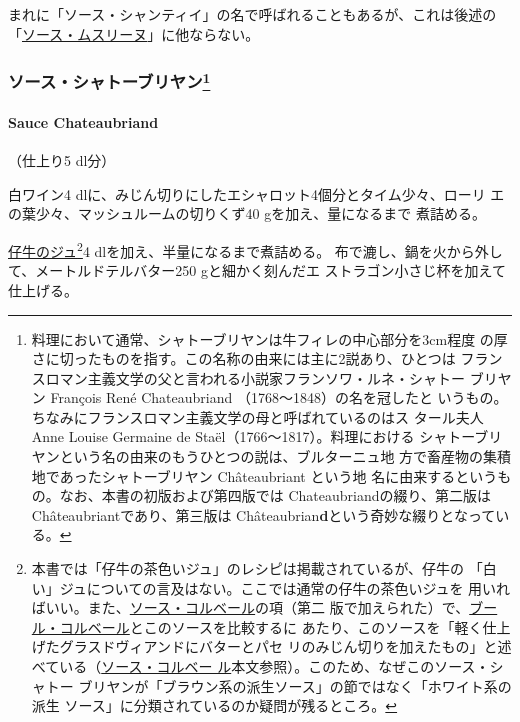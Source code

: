 \begin{recette}
まれに「ソース・シャンティイ」の名で呼ばれることもあるが、これは後述の
「\protect\hyperlink{sauce-mousseline}{ソース・ムスリーヌ}」に他ならない。

\maeaki

\hypertarget{ux30bdux30fcux30b9ux30b7ux30e3ux30c8ux30fcux30d6ux30eaux30e4ux30f323}{%
\subsubsection[ソース・シャトーブリヤン]{\texorpdfstring{ソース・シャトーブリヤン\footnote{料理において通常、シャトーブリヤンは牛フィレの中心部分を3cm程度
  の厚さに切ったものを指す。この名称の由来には主に2説あり、ひとつは
  フランスロマン主義文学の父と言われる小説家フランソワ・ルネ・シャトー
  ブリヤン François René Chateaubriand （1768〜1848）の名を冠したと
  いうもの。ちなみにフランスロマン主義文学の母と呼ばれているのはス
  タール夫人Anne Louise Germaine de Staël（1766〜1817）。料理における
  シャトーブリヤンという名の由来のもうひとつの説は、ブルターニュ地
  方で畜産物の集積地であったシャトーブリヤン Châteaubriant という地
  名に由来するというもの。なお、本書の初版および第四版では
  Chateaubriandの綴り、第二版はChâteaubriantであり、第三版は
  Châteaubrian\textbf{d}という奇妙な綴りとなっている。}}{ソース・シャトーブリヤン}}\label{ux30bdux30fcux30b9ux30b7ux30e3ux30c8ux30fcux30d6ux30eaux30e4ux30f323}}

\hypertarget{sauce-chateaubriand}{%
\paragraph{Sauce Chateaubriand}\label{sauce-chateaubriand}}


（仕上り5 dl分）

白ワイン4 dlに、みじん切りにしたエシャロット4個分とタイム少々、ローリ
エの葉少々、マッシュルームの切りくず40 gを加え、\untiers{}量になるまで
煮詰める。

\protect\hyperlink{jus-de-veau-brun}{仔牛のジュ}\footnote{本書では「仔牛の茶色いジュ」のレシピは掲載されているが、仔牛の
  「白い」ジュについての言及はない。ここでは通常の仔牛の茶色いジュを
  用いればいい。また、\protect\hyperlink{sauce-colbert}{ソース・コルベール}の項（第二
  版で加えられた）で、\href{}{ブール・コルベール}とこのソースを比較するに
  あたり、このソースを「軽く仕上げたグラスドヴィアンドにバターとパセ
  リのみじん切りを加えたもの」と述べている（\protect\hyperlink{sauce-colbert}{ソース・コルベー
  ル}本文参照）。このため、なぜこのソース・シャトー
  ブリヤンが「ブラウン系の派生ソース」の節ではなく「ホワイト系の派生
  ソース」に分類されているのか疑問が残るところ。}4
dlを加え、半量になるまで煮詰める。
布で漉し、鍋を火から外して、メートルドテルバター250 gと細かく刻んだエ
ストラゴン小さじ\undemi{}杯を加えて仕上げる。


\end{recette}
